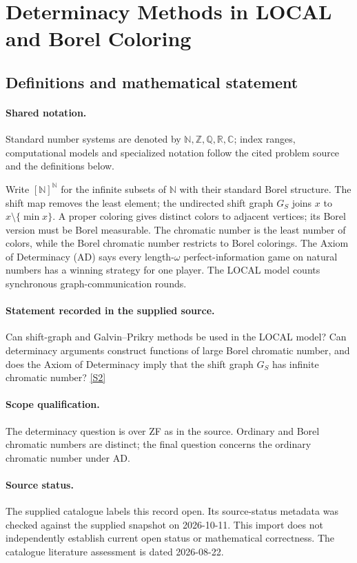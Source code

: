 \documentclass[11pt]{article}
\newcommand{\sref}[2]{\hyperlink{source:#1:#2}{[S#2]}}
\begin{document}
\section{Determinacy Methods in LOCAL and Borel Coloring}\label{statement}

\subsection{Definitions and mathematical statement}

\paragraph{Shared notation.}Standard number systems are denoted by $\mathbb N,\mathbb Z,\mathbb Q,\mathbb R,\mathbb C$; index ranges, computational models and specialized notation follow the cited problem source and the definitions below.


Write $[\mathbb N]^{\mathbb N}$ for the infinite subsets of $\mathbb N$ with their standard Borel structure. The shift map removes the least element; the undirected shift graph $G_S$ joins $x$ to $x\setminus\{\min x\}$. A proper coloring gives distinct colors to adjacent vertices; its Borel version must be Borel measurable. The chromatic number is the least number of colors, while the Borel chromatic number restricts to Borel colorings. The Axiom of Determinacy (AD) says every length-$\omega$ perfect-information game on natural numbers has a winning strategy for one player. The LOCAL model counts synchronous graph-communication rounds.
\paragraph{Statement recorded in the supplied source.}
Can shift-graph and Galvin–Prikry methods be used in the LOCAL model? Can determinacy arguments construct functions of large Borel chromatic number, and does the Axiom of Determinacy imply that the shift graph $G_S$ has infinite chromatic number? \sref{statement}{2}
\paragraph{Scope qualification.}
The determinacy question is over ZF as in the source. Ordinary and Borel chromatic numbers are distinct; the final question concerns the ordinary chromatic number under AD.
\paragraph{Source status.}
The supplied catalogue labels this record open. Its source-status metadata was checked against the supplied snapshot on 2026-10-11. This import does not independently establish current open status or mathematical correctness. The catalogue literature assessment is dated 2026-08-22.
\end{document}
